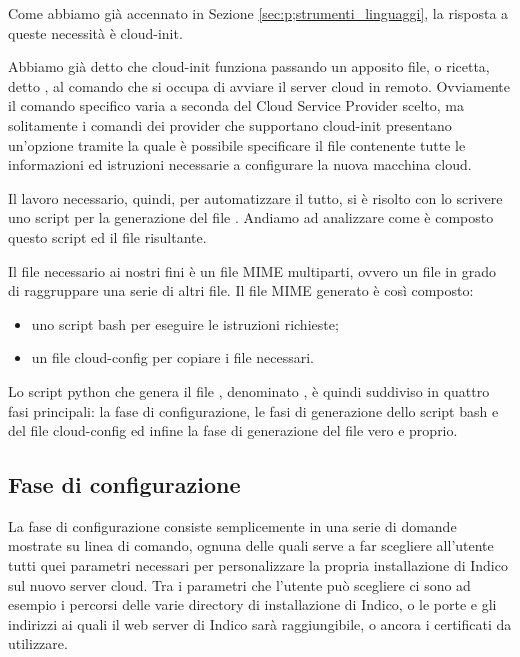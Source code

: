         Come abbiamo già accennato in Sezione \ref{sec:p;strumenti_linguaggi}, la risposta a queste necessità è cloud-init.
        
        Abbiamo già detto che cloud-init funziona passando un apposito file, o ricetta, detto , al comando che si occupa di avviare il server cloud in remoto. Ovviamente il comando specifico varia a seconda del Cloud Service Provider scelto, ma solitamente i comandi dei provider che supportano cloud-init presentano un'opzione tramite la quale è possibile specificare il file  contenente tutte le informazioni ed istruzioni necessarie a configurare la nuova macchina cloud.
        
        Il lavoro necessario, quindi, per automatizzare il tutto, si è risolto con lo scrivere uno script per la generazione del file . Andiamo ad analizzare come è composto questo script ed il file  risultante.
        
        Il file  necessario ai nostri fini è un file \ac{MIME} multiparti, ovvero un file in grado di raggruppare una serie di altri file. Il file \ac{MIME} generato è così composto:
        
        \begin{itemize}
            \item uno script bash per eseguire le istruzioni richieste;
            \item un file cloud-config per copiare i file necessari.
        \end{itemize}
        
        Lo script python che genera il file , denominato , è quindi suddiviso in quattro fasi principali: la fase di configurazione, le fasi di generazione dello script bash e del file cloud-config ed infine la fase di generazione del file  vero e proprio.
        
        \subsection{Fase di configurazione} \label{subsec:cd;dci;fase_configurazione}
        
            La fase di configurazione consiste semplicemente in una serie di domande mostrate su linea di comando, ognuna delle quali serve a far scegliere all'utente tutti quei parametri necessari per personalizzare la propria installazione di Indico sul nuovo server cloud. Tra i parametri che l'utente può scegliere ci sono ad esempio i percorsi delle varie directory di installazione di Indico, o le porte e gli indirizzi ai quali il web server di Indico sarà raggiungibile, o ancora i certificati  da utilizzare.
            
